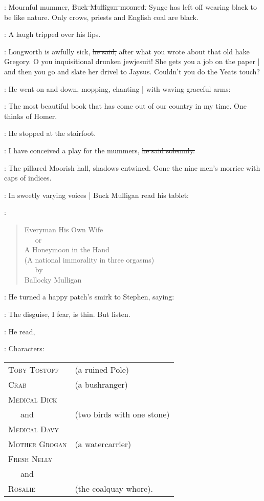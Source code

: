 \mulligan:
Mournful mummer,
\sout{Buck Mulligan moaned.}
Synge has left off wearing black to be like nature.
Only crows, priests and English coal are black.

:
A laugh tripped over his lips.

\mulligan:
Longworth is awfully sick,
\sout{he said,}
after what you wrote about that old hake Gregory.
O you inquisitional drunken jewjesuit!
She gets you a job on the paper |
and then you go and slate her drivel to Jaysus.
Couldn't you do the Yeats touch?

:
He went on and down,
mopping,
chanting |
with waving graceful arms:

\mulligan:
The most beautiful book that has come out of our country in my time.
One thinks of Homer.

:
He stopped at the stairfoot.

\mulligan:
I have conceived a play for the mummers,
\sout{he said solemnly.}

:
The pillared Moorish hall,
shadows entwined.
Gone the nine men's morrice with caps of indices.

:
In sweetly varying voices |
Buck Mulligan read his tablet:

\mulligan:
\begin{verse}
        Everyman His Own Wife \\
          \ \ \ or \\
        A Honeymoon in the Hand \\
    (A national immorality in three orgasms) \\
          \ \ \ by \\
        Ballocky Mulligan
    \end{verse}

:
He turned a happy patch's smirk to Stephen,
saying:

\mulligan:
The disguise,
I fear,
is thin.
But listen.

:
He read,

\mulligan:
Characters:
 \\
\begin{tabular}{lp{10cm}}
    \textsc{Toby Tostoff}    & (a ruined Pole) \\
    \textsc{Crab}            & (a bushranger) \\
    \textsc{Medical Dick}    & \\
        \ \ \ and            & (two birds with one stone) \\
    \textsc{Medical Davy}    & \\
    \textsc{Mother Grogan}   & (a watercarrier) \\
    \textsc{Fresh Nelly} \\
        \ \ \ and \\
    \textsc{Rosalie}        & (the coalquay whore).
\end{tabular}

